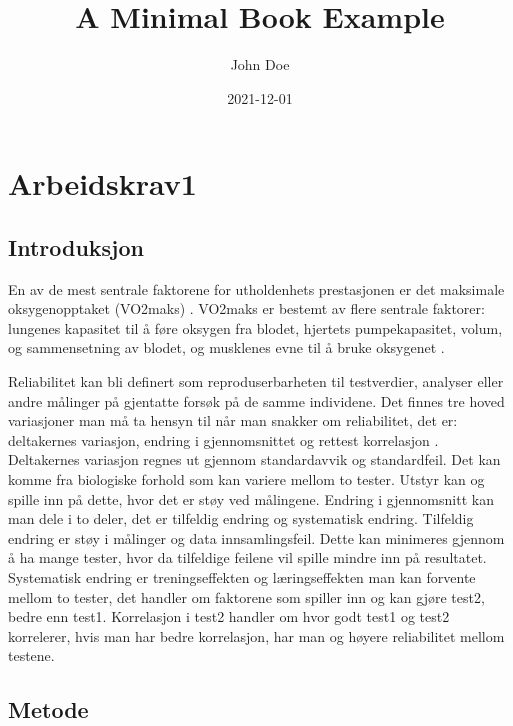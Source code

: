 \documentclass[
]{book}
\title{A Minimal Book Example}
\author{John Doe}
\date{2021-12-01}
\begin{document}
\maketitle

{
\setcounter{tocdepth}{1}
\tableofcontents
}
\hypertarget{arbeidskrav1}{%
\chapter{Arbeidskrav1}\label{arbeidskrav1}}

\hypertarget{introduksjon}{%
\section{Introduksjon}\label{introduksjon}}

En av de mest sentrale faktorene for utholdenhets prestasjonen er det maksimale oksygenopptaket (VO2maks) \citet{bassett2000}. VO2maks er bestemt av flere sentrale faktorer: lungenes kapasitet til å føre oksygen fra blodet, hjertets pumpekapasitet, volum, og sammensetning av blodet, og musklenes evne til å bruke oksygenet \citet{bassett2000}.

Reliabilitet kan bli definert som reproduserbarheten til testverdier, analyser eller andre målinger på gjentatte forsøk på de samme individene. Det finnes tre hoved variasjoner man må ta hensyn til når man snakker om reliabilitet, det er: deltakernes variasjon, endring i gjennomsnittet og rettest korrelasjon \citet{hopkins2000}. Deltakernes variasjon regnes ut gjennom standardavvik og standardfeil. Det kan komme fra biologiske forhold som kan variere mellom to tester. Utstyr kan og spille inn på dette, hvor det er støy ved målingene. Endring i gjennomsnitt kan man dele i to deler, det er tilfeldig endring og systematisk endring. Tilfeldig endring er støy i målinger og data innsamlingsfeil. Dette kan minimeres gjennom å ha mange tester, hvor da tilfeldige feilene vil spille mindre inn på resultatet. Systematisk endring er treningseffekten og læringseffekten man kan forvente mellom to tester, det handler om faktorene som spiller inn og kan gjøre test2, bedre enn test1. Korrelasjon i test2 handler om hvor godt test1 og test2 korrelerer, hvis man har bedre korrelasjon, har man og høyere reliabilitet mellom testene.

\hypertarget{metode}{%
\section{Metode}\label{metode}}
\end{document}
